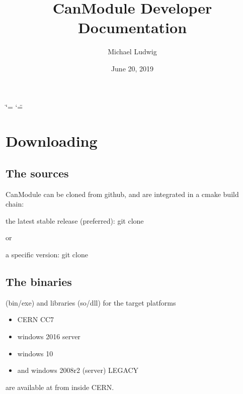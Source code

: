 \documentclass[letterpaper,10pt,english]{sphinxmanual}
\title{CanModule Developer Documentation}
\date{June 20, 2019}
\author{Michael Ludwig}
\begin{document}
\ifdefined\shorthandoff
  \ifnum\catcode`\=\string=\active\shorthandoff{=}\fi
  \ifnum\catcode`\"=\active{}\fi
\fi

\pagestyle{empty}
\sphinxmaketitle
\pagestyle{plain}
\sphinxtableofcontents
\pagestyle{normal}
\label{\detokenize{index::doc}}



\chapter{Downloading}
\label{\detokenize{downloading:downloading}}\label{\detokenize{downloading::doc}}

\section{The sources}
\label{\detokenize{downloading:the-sources}}
CanModule can be cloned from github, and are integrated in a cmake build chain:

the latest stable release (preferred):
git clone  

or

a specific version:
git clone  


\section{The binaries}
\label{\detokenize{downloading:the-binaries}}
(bin/exe) and libraries (so/dll) for the target platforms
\begin{itemize}
\item {} 
CERN CC7

\item {} 
windows 2016 server

\item {} 
windows 10

\item {} 
and windows 2008r2 (server) LEGACY

\end{itemize}

are available at  from inside CERN.
\end{document}
